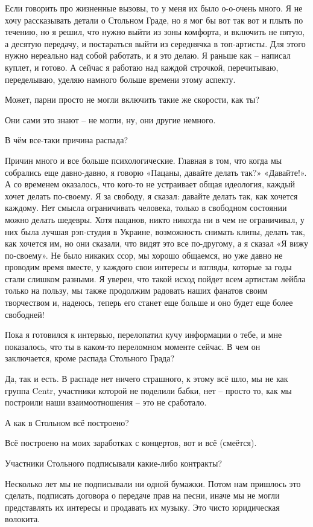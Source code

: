 Если говорить про жизненные вызовы, то  у меня их было о-о-очень много. Я не
хочу рассказывать детали о Стольном Граде, но я мог бы вот так вот и плыть по
течению, но я решил, что нужно выйти из зоны комфорта, и включить не пятую, а
десятую передачу, и постараться выйти из середнячка в топ-артисты. Для этого
нужно нереально над собой работать, и я это делаю. Я раньше как – написал
куплет, и готово. А сейчас я работаю над каждой строчкой, перечитываю,
переделываю, уделяю намного больше времени этому аспекту.

Может, парни просто не могли включить такие же скорости, как ты?

Они сами это знают – не могли, ну, они другие немного.

В чём все-таки причина распада?

Причин много и все больше психологические. Главная в том, что когда мы
собрались еще давно-давно, я говорю «Пацаны, давайте делать так?» «Давайте!». А
со временем оказалось, что кого-то не устраивает общая идеология, каждый хочет
делать по-своему. Я за свободу, я сказал: давайте делать так, как хочется
каждому. Нет смысла ограничивать человека, только в свободном состоянии можно
делать шедевры. Хотя пацанов, никто никогда ни в чем не ограничивал, у них была
лучшая рэп-студия в Украине, возможность снимать клипы, делать так, как хочется
им, но они сказали, что видят это все по-другому, а я сказал «Я вижу
по-своему». Не было никаких ссор, мы хорошо общаемся, но уже давно не проводим
время вместе, у каждого свои интересы и взгляды, которые за годы стали слишком
разными. Я уверен, что такой исход пойдет всем артистам лейбла только на
пользу, мы также продолжим радовать наших фанатов своим творчеством и, надеюсь,
теперь его станет еще больше и оно будет еще более свободней!

Пока я готовился к интервью, перелопатил кучу информации о тебе, и мне
показалось, что ты в каком-то переломном моменте сейчас. В чем он заключается,
кроме распада Стольного Града?

Да, так и есть. В распаде нет ничего страшного, к этому всё шло, мы не как
группа Centr, участники которой не поделили бабки, нет – просто то, как мы
построили наши взаимоотношения – это не сработало.

А как в Стольном всё построено?

Всё построено на моих заработках с концертов, вот и всё (смеётся).

Участники Стольного подписывали какие-либо контракты?

Несколько лет мы не подписывали ни одной бумажки. Потом нам пришлось это
сделать, подписать договора о передаче прав на песни, иначе мы не могли
представлять их интересы и продавать их музыку. Это чисто юридическая волокита.

